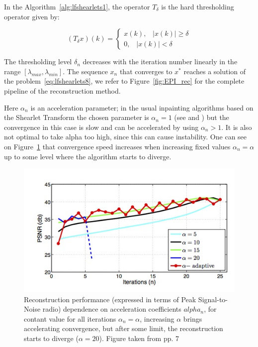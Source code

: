 \bigskip

In the Algorithm~\ref{alg:lfshearlets1}, the operator $T_{\delta}$ is the hard thresholding operator given by:

$$
(T_{\delta}x)(k)=\begin{cases} x(k)\textrm{,}\quad |x(k)|\geq \delta \\ 0\textrm{,}\quad |x(k)|<\delta \end{cases}
$$

The thresholding level $\delta_n$ decreases with the iteration number linearly in the range $[\lambda_{max},\lambda_{min}]$. The sequence $x_n$ that converges to $x^*$ reaches a solution of the problem~\ref{eq:lfshearlets8}, we refer to Figure~\ref{fig:EPI_rec} for the complete pipeline of the reconstruction method.

\bigskip

Here $\alpha_n$ is an acceleration parameter; in the usual inpainting algorithms based on the Shearlet Transform the chosen parameter is $\alpha_n=1$ (see \cite{Analysisinpaint} and \cite{Shearlab}) but the convergence in this case is slow and can be accelerated by using $\alpha_n>1$. It is also not optimal to take alpha too high, since this can cause instability. One can see on Figure~\ref{fig:alpha_accel} that convergence speed increases when increasing fixed values $\alpha_n = \alpha$ up to some level where the algorithm starts to diverge.

\begin{figure}[h!]
\centering
\includegraphics[width = 0.9 \textwidth]{./Diagrams/alpha_accel.jpg}
\caption{Reconstruction performance (expressed in terms of Peak Signal-to-Noise radio) dependence on acceleration coefficients $alpha_n$, for contant value for all iterations $\alpha_n=\alpha$, increasing $\alpha$ brings accelerating convergence, but after some limit, the reconstruction starts to diverge ($\alpha = 20$). Figure taken from \cite{LF-Shearlets} pp. 7}
\label{fig:alpha_accel}
\end{figure}

